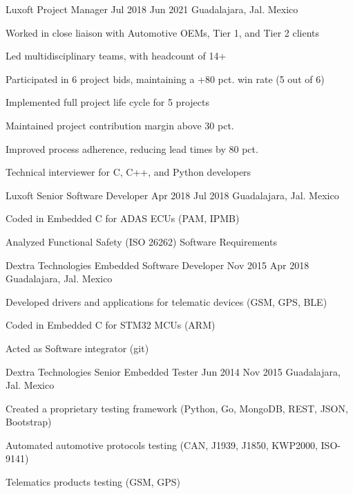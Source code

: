 \documentclass{resume} %
\begin{document}
\job
    {Luxoft}
    {Project Manager}
    {Jul 2018}
    {Jun 2021}
    {Guadalajara, Jal. Mexico}
    {
    \begin{itemize-bullets}
    \item{Worked in close liaison with Automotive OEMs, Tier 1, and Tier 2 clients}
    \item{Led multidisciplinary teams, with headcount of 14+}
    \item{Participated in 6 project bids, maintaining a +80 pct. win rate (5 out of 6)}
    \item{Implemented full project life cycle for 5 projects}
    \item{Maintained project contribution margin above 30 pct. }
    \item{Improved process adherence, reducing lead times by 80 pct.}
    \item{Technical interviewer for C, C++, and Python developers}
    \end{itemize-bullets}
    }


\job
    {Luxoft}
    {Senior Software Developer}
    {Apr 2018}
    {Jul 2018}
    {Guadalajara, Jal. Mexico}
    {
    \begin{itemize-bullets}
    \item{Coded in Embedded C for ADAS ECUs (PAM, IPMB)}
    \item{Analyzed Functional Safety (ISO 26262) Software Requirements}
    \end{itemize-bullets}
    }


\job
    {Dextra Technologies}
    {Embedded Software Developer}
    {Nov 2015}
    {Apr 2018}
    {Guadalajara, Jal. Mexico}
    {
    \begin{itemize-bullets}
    \item{Developed drivers and applications for telematic devices (GSM, GPS, BLE)}
    \item{Coded in Embedded C for STM32 MCUs (ARM)}
    \item{Acted as Software integrator (git)}
    \end{itemize-bullets}
    }


\job
    {Dextra Technologies}
    {Senior Embedded Tester}
    {Jun 2014}
    {Nov 2015}
    {Guadalajara, Jal. Mexico}
    {
    \begin{itemize-bullets}
    \item{Created a proprietary testing framework (Python, Go, MongoDB, REST, JSON, Bootstrap)}
    \item{Automated automotive protocols testing (CAN, J1939, J1850, KWP2000, ISO-9141)}
    \item{Telematics products testing (GSM, GPS)}
    \end{itemize-bullets}
    }
\end{document}
